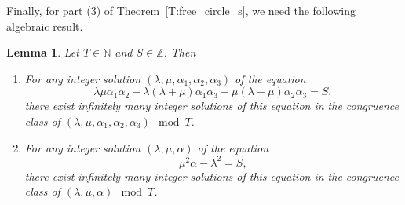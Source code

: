 \documentclass[pdftex]{sigma}
\numberwithin{equation}{section}
\newtheorem{Lemma}[Theorem]{Lemma}
\theoremstyle{definition}
\numberwithin{table}{section}
\newcommand{\N}{\mathbb{N}}
\newcommand{\Z}{\mathbb{Z}}
\begin{document}
Finally, for part (3) of Theorem~\ref{T:free_circle_s}, we need the following algebraic result.
\begin{Lemma}\label{L:number_theory}
	Let $T\in\N$ and $S\in\Z$. Then
	\begin{enumerate}\itemsep=0pt
		\item[$(1)$] For any integer solution $(\lambda,\mu,\alpha_1,\alpha_2,\alpha_3)$ of the equation
		\begin{equation}\label{EQ:la-mu}
			\lambda\mu\alpha_1\alpha_2-\lambda(\lambda+\mu)\alpha_1\alpha_3-\mu(\lambda+\mu)\alpha_2\alpha_3=S,
		\end{equation}
		there exist infinitely many integer solutions of this equation in the congruence class of $(\lambda,\mu,\alpha_1,\alpha_2,\alpha_3)\mod T$.
		\item[$(2)$] For any integer solution $(\lambda,\mu,\alpha)$ of the equation
		\begin{equation}\label{EQ:la-mu-a}
			\mu^2\alpha-\lambda^2=S,
		\end{equation}
		there exist infinitely many integer solutions of this equation in the congruence class of $(\lambda,\mu,\alpha)\mod T$.
	\end{enumerate}
\end{Lemma}
\end{document}
